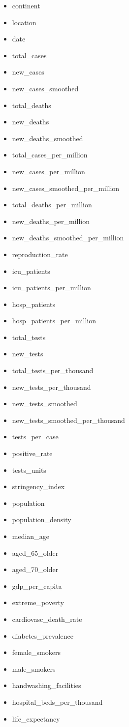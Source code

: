 \documentclass[]{article}
\providecommand{\tightlist}{%
  \setlength{\itemsep}{0pt}\setlength{\parskip}{0pt}}
\begin{document}
\begin{itemize}
\tightlist
\item
  continent
\item
  location
\item
  date
\item
  total\_cases
\item
  new\_cases
\item
  new\_cases\_smoothed
\item
  total\_deaths
\item
  new\_deaths
\item
  new\_deaths\_smoothed
\item
  total\_cases\_per\_million
\item
  new\_cases\_per\_million
\item
  new\_cases\_smoothed\_per\_million
\item
  total\_deaths\_per\_million
\item
  new\_deaths\_per\_million
\item
  new\_deaths\_smoothed\_per\_million
\item
  reproduction\_rate
\item
  icu\_patients
\item
  icu\_patients\_per\_million
\item
  hosp\_patients
\item
  hosp\_patients\_per\_million
\item
  total\_tests
\item
  new\_tests
\item
  total\_tests\_per\_thousand
\item
  new\_tests\_per\_thousand
\item
  new\_tests\_smoothed
\item
  new\_tests\_smoothed\_per\_thousand
\item
  tests\_per\_case
\item
  positive\_rate
\item
  tests\_units
\item
  stringency\_index
\item
  population
\item
  population\_density
\item
  median\_age
\item
  aged\_65\_older
\item
  aged\_70\_older
\item
  gdp\_per\_capita
\item
  extreme\_poverty
\item
  cardiovasc\_death\_rate
\item
  diabetes\_prevalence
\item
  female\_smokers
\item
  male\_smokers
\item
  handwashing\_facilities
\item
  hospital\_beds\_per\_thousand
\item
  life\_expectancy
\end{itemize}
\end{document}
